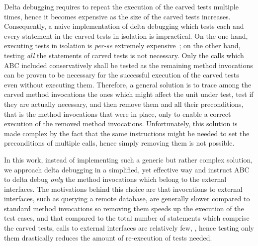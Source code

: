 \documentclass[10pt,conference]{IEEEtran}
\newcommand{\abc}{\textsf{ABC}\xspace}
\begin{document}
Delta debugging requires to repeat the execution of the carved tests multiple times, hence it becomes expensive as the size of the carved tests
increases. Consequently, a naive implementation of delta debugging which tests each and every statement in the carved tests in
isolation is impractical. On the one hand, executing tests in isolation is \emph{per-se} extremely expensive~\cite{jonbell:vmvm};
on the other hand, testing \emph{all} the statements of carved tests is not necessary. Only the calls which \abc included conservatively
shall be tested as the remaining method invocations can be proven to be necessary for the successful execution of the
carved tests even without executing them. Therefore, a general solution is to trace among the carved method invocations the ones which might affect
the unit under test, test if they are actually necessary, and then remove them and all their preconditions, that is the method invocations that
were in place, only to enable a correct execution of the removed method invocations. Unfortunately, this solution is made complex by the fact
that the same instructions might be needed to set the preconditions of multiple calls, hence simply removing them is not possible.

In this work, instead of implementing such a generic but rather complex solution, we approach delta debugging in a simplified, yet effective way
and instruct \abc to delta debug \emph{only} the method invocations which belong to the external interfaces.
The motivations behind this choice are that invocations to external interfaces, such as querying a
remote database, are generally slower compared to standard method invocations so removing them speeds up the execution of the
test cases, and that compared to the total number of statements which comprise the carved tests, calls to external interfaces are relatively few,
, hence testing only them drastically reduces the amount of re-execution of tests needed. 
%
%
%
%
%
\end{document}
